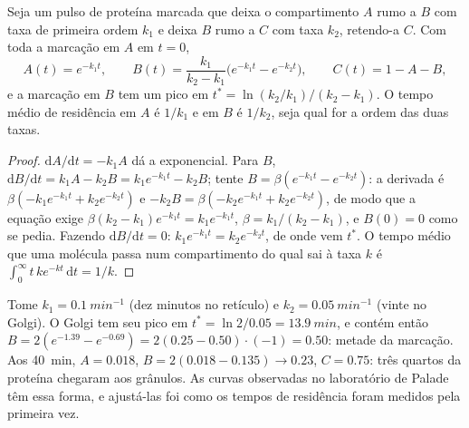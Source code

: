 \begin{theorem}\label{thm:b3:membrane-traffic:pulse-chase}
Seja um pulso de proteína marcada que deixa o compartimento $A$ rumo a
$B$ com taxa de primeira ordem $k_{1}$ e deixa $B$ rumo a $C$ com taxa
$k_{2}$, retendo-a $C$. Com toda a marcação em $A$ em $t = 0$,
\[
A(t) = e^{-k_{1}t},\qquad
B(t) = \frac{k_{1}}{k_{2} - k_{1}}\bigl(e^{-k_{1}t} - e^{-k_{2}t}\bigr),
\qquad
C(t) = 1 - A - B,
\]
e a marcação em $B$ tem um pico em
$t^{*} = \ln(k_{2}/k_{1})/(k_{2} - k_{1})$. O tempo médio de residência
em $A$ é $1/k_{1}$ e em $B$ é $1/k_{2}$, seja qual for a ordem das duas
taxas.
\end{theorem}
\begin{proof}
$\mathrm{d}A/\mathrm{d}t = -k_{1}A$ dá a exponencial. Para $B$,
$\mathrm{d}B/\mathrm{d}t = k_{1}A - k_{2}B = k_{1}e^{-k_{1}t} - k_{2}B$;
tente $B = \beta(e^{-k_{1}t} - e^{-k_{2}t})$: a derivada é
$\beta(-k_{1}e^{-k_{1}t} + k_{2}e^{-k_{2}t})$ e $-k_{2}B = \beta(-k_{2}
e^{-k_{1}t} + k_{2}e^{-k_{2}t})$, de modo que a equação exige $\beta(k_{2}
- k_{1})e^{-k_{1}t} = k_{1}e^{-k_{1}t}$, $\beta = k_{1}/(k_{2} -
k_{1})$, e $B(0) = 0$ como se pedia. Fazendo
$\mathrm{d}B/\mathrm{d}t =
0$: $k_{1}e^{-k_{1}t} = k_{2}e^{-k_{2}t}$,
de onde vem $t^{*}$. O tempo médio que uma molécula passa num
compartimento do qual sai à taxa $k$ é $\int_{0}^{
\infty} t\,k e^{-kt}\,\mathrm{d}t = 1/k$.
\end{proof}

\begin{example}\label{ex:b3:membrane-traffic:palade}
Tome $k_{1} = \qty{0.1}{min^{-1}}$ (dez minutos no retículo) e
$k_{2} = \qty{0.05}{min^{-1}}$ (vinte no Golgi). O Golgi tem seu pico
em $t^{*} = \ln 2/0.05 = \qty{13.9}{min}$, e contém então
$B = 2(e^{-1.39} -
e^{-0.69}) = 2(0.25 - 0.50)\cdot(-1) = 0.50$: metade
da marcação. Aos \qty{40}{min}, $A = 0.018$,
$B = 2(0.018 - 0.135) \to 0.23$, $C = 0.75$: três quartos da proteína
chegaram aos grânulos. As curvas observadas no laboratório de Palade
têm essa forma, e ajustá-las foi como os tempos de residência foram
medidos pela primeira vez.
\end{example}

